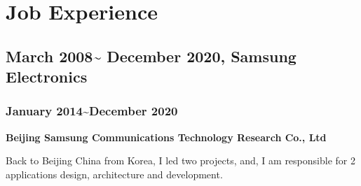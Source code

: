 \documentclass{article}
\begin{document}
\section{Job Experience}
\subsection{March 2008\~{} December 2020, Samsung Electronics}

\subsubsection{January 2014\~{}December 2020}
\textbf{Beijing Samsung Communications Technology Research Co., Ltd}

Back to Beijing China from Korea, I led two projects, and, I am responsible for 2 applications design, architecture and development.
\end{document}
